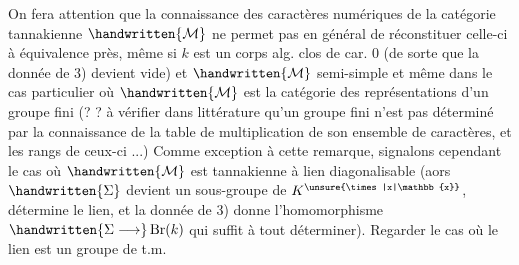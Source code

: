 On fera attention que la connaissance des caractères numériques de la catégorie tannakienne $\handwritten{\mathcal{M}}$ ne permet pas en général de réconstituer celle-ci à équivalence près, même si $k$ est un corps alg. clos de car. 0 (de sorte que la donnée de 3) devient vide) et $\handwritten{\mathcal{M}}$ semi-simple
et même dans le cas particulier où $\handwritten{\mathcal{M}}$ est la catégorie des représentations d'un groupe fini (? ? à vérifier dans littérature qu'un groupe fini n'est pas déterminé par la connaissance de la table de multiplication de  son ensemble de caractères, et les rangs de ceux-ci ...) Comme exception à cette remarque, signalons cependant le cas où $\handwritten{\mathcal{M}}$ est tannakienne à lien diagonalisable (aors $\handwritten{\Sigma}$ devient un sous-groupe de $K^{\unsure{\times|x|\mathbb{x}}}$,  détermine le lien, et la donnée de 3) donne l'homomorphisme $\handwritten{\Sigma\longrightarrow}\operatorname{Br}(k)$ qui suffit à tout déterminer). Regarder le cas où le lien est un groupe de t.m.

